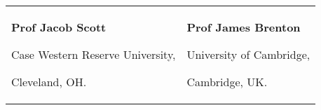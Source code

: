

\begin{tabularx}{\textwidth}{@{}X X@{}}
\textbf{Prof Jacob Scott}\par
Case Western Reserve University,\par 
Cleveland, OH.\par 
\makefield{\faEnvelopeO}{\url{scottj10@ccf.org}}
& 
\textbf{Prof James Brenton}\par
University of Cambridge,\par 
Cambridge, UK.\par 
\makefield{\faEnvelopeO}{\url{james.brenton@cruk.cam.ac.uk}}
\\
\end{tabularx}
